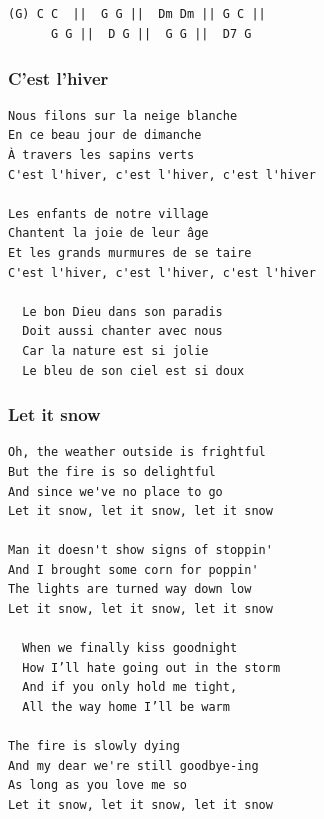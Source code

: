 \documentclass[
]{article}
\begin{document}
\hypertarget{section-5}{%
\subsection*{}\label{section-5}}

\begin{verbatim}
(G) C C  ||  G G ||  Dm Dm || G C ||
      G G ||  D G ||  G G ||  D7 G
\end{verbatim}

\hypertarget{cest-lhiver}{%
\subsubsection*{C'est l'hiver}\label{cest-lhiver}}

\begin{verbatim}
Nous filons sur la neige blanche
En ce beau jour de dimanche
À travers les sapins verts
C'est l'hiver, c'est l'hiver, c'est l'hiver

Les enfants de notre village
Chantent la joie de leur âge
Et les grands murmures de se taire
C'est l'hiver, c'est l'hiver, c'est l'hiver

  Le bon Dieu dans son paradis
  Doit aussi chanter avec nous
  Car la nature est si jolie
  Le bleu de son ciel est si doux
\end{verbatim}

\hypertarget{let-it-snow}{%
\subsubsection*{Let it snow}\label{let-it-snow}}

\begin{verbatim}
Oh, the weather outside is frightful
But the fire is so delightful
And since we've no place to go
Let it snow, let it snow, let it snow

Man it doesn't show signs of stoppin'
And I brought some corn for poppin'
The lights are turned way down low
Let it snow, let it snow, let it snow

  When we finally kiss goodnight
  How I’ll hate going out in the storm
  And if you only hold me tight,
  All the way home I’ll be warm

The fire is slowly dying
And my dear we're still goodbye-ing
As long as you love me so
Let it snow, let it snow, let it snow
\end{verbatim}
\end{document}
